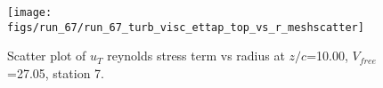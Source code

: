 \begin{figure}[H]
\centering
\texttt{[image: figs/run\_67/run\_67\_turb\_visc\_ettap\_top\_vs\_r\_meshscatter]}
\caption{Scatter plot of $
u_T$ reynolds stress term vs radius at $z/c$=10.00, $V_{free}$=27.05, station 7.}
\end{figure}


